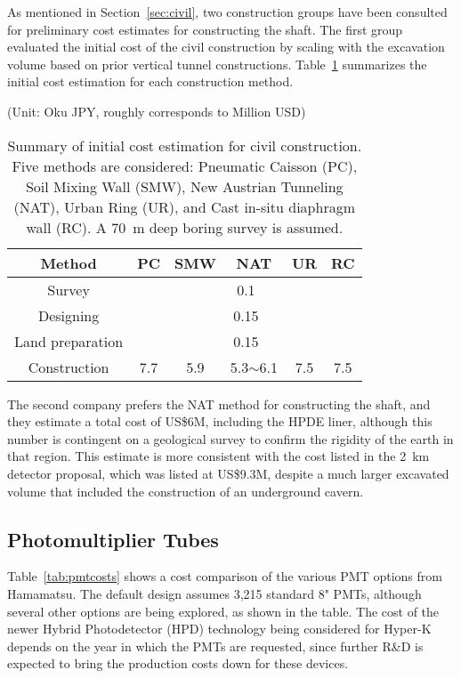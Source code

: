As mentioned in Section~\ref{sec:civil}, two construction groups have been consulted for preliminary cost estimates for constructing the shaft. The first group evaluated the initial cost of the civil construction by scaling with the excavation
volume based on prior vertical tunnel constructions. Table~\ref{tab:civil_cost} summarizes the initial cost estimation for each construction method.
\begin{table}[htbp]
  \begin{center}
    \caption{Summary of initial cost estimation for civil construction. Five methods are considered: Pneumatic Caisson (PC), Soil Mixing Wall (SMW), New Austrian Tunneling (NAT), Urban Ring (UR), and Cast in-situ diaphragm wall (RC). A 70~m deep boring survey is assumed.}
    (Unit: Oku JPY, roughly corresponds to Million USD)
    \label{tab:civil_cost}
    \begin{tabular}{|c|c|c|c|c|c|}
      \hline
      Method & PC & SMW & NAT & UR & RC \\
      \hline\hline
      Survey & \multicolumn{5}{|c|}{0.1} \\ \hline
      Designing & \multicolumn{5}{|c|}{0.15} \\ \hline
      Land preparation & \multicolumn{5}{|c|}{0.15} \\ \hline
      Construction & 7.7 & 5.9 & 5.3$\sim$6.1 & 7.5 & 7.5 \\
      \hline
    \end{tabular}
  \end{center}
\end{table}

The second company prefers the NAT method for constructing the shaft, and they estimate a total cost of US\$6M, including the HPDE liner, although this number is contingent on a geological survey to confirm the rigidity of the earth in that region. This estimate is more consistent with the cost listed in the 2~km detector proposal, which was listed at US\$9.3M, despite a much larger excavated volume that included the construction of an underground cavern.


\subsection{Photomultiplier Tubes}

Table~\ref{tab:pmtcosts} shows a cost comparison of the various PMT options from Hamamatsu. The default design assumes 3,215 standard 8" PMTs, although several other options are being explored, as shown in the table. The cost of the newer Hybrid Photodetector (HPD) technology being considered for Hyper-K depends on the year in which the PMTs are requested, since further R\&D is expected to bring the production costs down for these devices.

